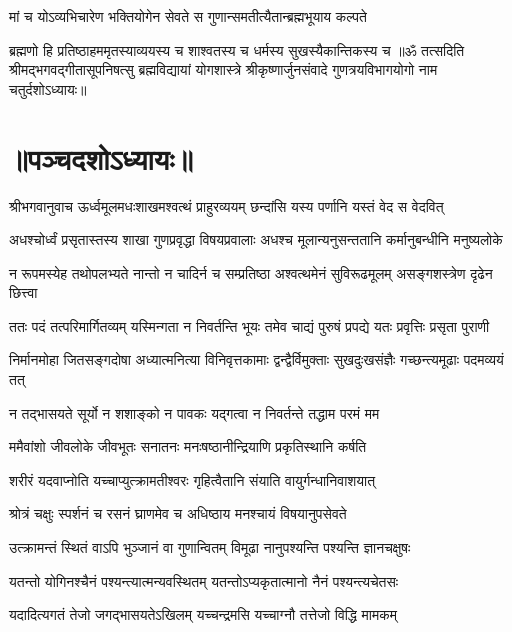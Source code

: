 \twolineshloka
{मां च योऽव्यभिचारेण भक्तियोगेन सेवते}
{स गुणान्समतीत्यैतान्ब्रह्मभूयाय कल्पते}%

\twolineshloka
{ब्रह्मणो हि प्रतिष्ठाहममृतस्याव्ययस्य च}
{शाश्वतस्य च धर्मस्य सुखस्यैकान्तिकस्य च}%
{॥ॐ तत्सदिति श्रीमद्भगवद्गीतासूपनिषत्सु ब्रह्मविद्यायां योगशास्त्रे श्रीकृष्णार्जुनसंवादे गुणत्रयविभागयोगो नाम चतुर्दशोऽध्यायः॥}

\section{॥पञ्चदशोऽध्यायः॥}
{श्रीभगवानुवाच}
\twolineshloka
{ऊर्ध्वमूलमधःशाखमश्वत्थं प्राहुरव्ययम्}
{छन्दांसि यस्य पर्णानि यस्तं वेद स वेदवित्}%

\fourlineindentedshloka
{अधश्चोर्ध्वं प्रसृतास्तस्य शाखा}
{गुणप्रवृद्धा विषयप्रवालाः}
{अधश्च मूलान्यनुसन्ततानि}
{कर्मानुबन्धीनि मनुष्यलोके}%

\fourlineindentedshloka
{न रूपमस्येह तथोपलभ्यते}
{नान्तो न चादिर्न च सम्प्रतिष्ठा}
{अश्वत्थमेनं सुविरूढमूलम्}
{असङ्गशस्त्रेण दृढेन छित्त्वा}%

\fourlineindentedshloka
{ततः पदं तत्परिमार्गितव्यम्}
{यस्मिन्गता न निवर्तन्ति भूयः}
{तमेव चाद्यं पुरुषं प्रपद्ये}
{यतः प्रवृत्तिः प्रसृता पुराणी}%

\fourlineindentedshloka
{निर्मानमोहा जितसङ्गदोषा}
{अध्यात्मनित्या विनिवृत्तकामाः}
{द्वन्द्वैर्विमुक्ताः सुखदुःखसंज्ञैः}
{गच्छन्त्यमूढाः पदमव्ययं तत्}%

\twolineshloka
{न तद्भासयते सूर्यो न शशाङ्को न पावकः}
{यद्गत्वा न निवर्तन्ते तद्धाम परमं मम}%

\twolineshloka
{ममैवांशो जीवलोके जीवभूतः सनातनः}
{मनःषष्ठानीन्द्रियाणि प्रकृतिस्थानि कर्षति}%

\twolineshloka
{शरीरं यदवाप्नोति यच्चाप्युत्क्रामतीश्वरः}
{गृहित्वैतानि संयाति वायुर्गन्धानिवाशयात्}%

\twolineshloka
{श्रोत्रं चक्षुः स्पर्शनं च रसनं घ्राणमेव च}
{अधिष्ठाय मनश्चायं विषयानुपसेवते}%

\twolineshloka
{उत्क्रामन्तं स्थितं वाऽपि भुञ्जानं वा गुणान्वितम्}
{विमूढा नानुपश्यन्ति पश्यन्ति ज्ञानचक्षुषः}%

\twolineshloka
{यतन्तो योगिनश्चैनं पश्यन्त्यात्मन्यवस्थितम्}
{यतन्तोऽप्यकृतात्मानो नैनं पश्यन्त्यचेतसः}%

\twolineshloka
{यदादित्यगतं तेजो जगद्भासयतेऽखिलम्}
{यच्चन्द्रमसि यच्चाग्नौ तत्तेजो विद्धि मामकम्}%

